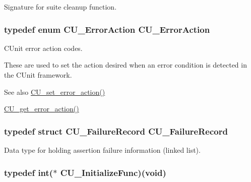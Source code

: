 Signature for suite cleanup function. 

\hypertarget{group___framework_gab68a2bd9fee7d73f79c0cfc68c576b3a}{
\subsubsection[{C\+U\+\_\+\+Error\+Action}]{\setlength{\rightskip}{0pt plus 5cm}typedef enum {\bf C\+U\+\_\+\+Error\+Action}  {\bf C\+U\+\_\+\+Error\+Action}}}\label{group___framework_gab68a2bd9fee7d73f79c0cfc68c576b3a}


C\+Unit error action codes. 

These are used to set the action desired when an error condition is detected in the C\+Unit framework. \begin{DoxySeeAlso}{See also}
\hyperlink{group___framework_ga58f4bdc1a05802f89005a487768b3d75}{C\+U\+\_\+set\+\_\+error\+\_\+action()} 

\hyperlink{group___framework_gab2e98ce95448aa5a04a4875bc8152d6e}{C\+U\+\_\+get\+\_\+error\+\_\+action()} 
\end{DoxySeeAlso}
\hypertarget{group___framework_ga5cada0980a95780d4d7c9f2f9b73d8ad}{
\subsubsection[{C\+U\+\_\+\+Failure\+Record}]{\setlength{\rightskip}{0pt plus 5cm}typedef struct {\bf C\+U\+\_\+\+Failure\+Record}  {\bf C\+U\+\_\+\+Failure\+Record}}}\label{group___framework_ga5cada0980a95780d4d7c9f2f9b73d8ad}


Data type for holding assertion failure information (linked list). 

\hypertarget{group___framework_gaab4b8ad3aa3a3c222c43c8a330de11e3}{
\subsubsection[{C\+U\+\_\+\+Initialize\+Func}]{\setlength{\rightskip}{0pt plus 5cm}typedef int($\ast$ C\+U\+\_\+\+Initialize\+Func)(void)}}\label{group___framework_gaab4b8ad3aa3a3c222c43c8a330de11e3}


